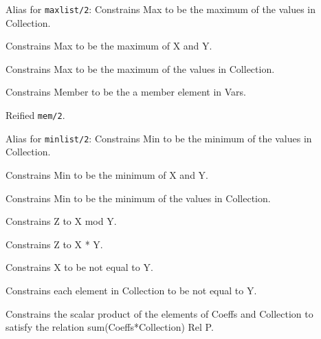 \begin{description}
\item[]
Alias for {\tt maxlist/2}: Constrains Max to be the maximum of the values in Collection.

\item[]
Constrains Max to be the maximum of X and Y.

\item[]
Constrains Max to be the maximum of the values in Collection.

\item[]
Constrains Member to be the a member element in Vars.

\item[]
Reified {\tt mem/2}.

\item[]
Alias for {\tt minlist/2}: Constrains Min to be the minimum of the values in Collection.

\item[]
Constrains Min to be the minimum of X and Y.

\item[]
Constrains Min to be the minimum of the values in Collection.

\item[]
Constrains Z to X mod Y.

\item[]
Constrains Z to X * Y.

\item[]
Constrains X to be not equal to Y.

\item[]
Constrains each element in Collection to be not equal to Y.

\item[]
Constrains the scalar product of the elements of Coeffs
 and Collection to satisfy the relation sum(Coeffs*Collection) Rel P.


\end{description}
